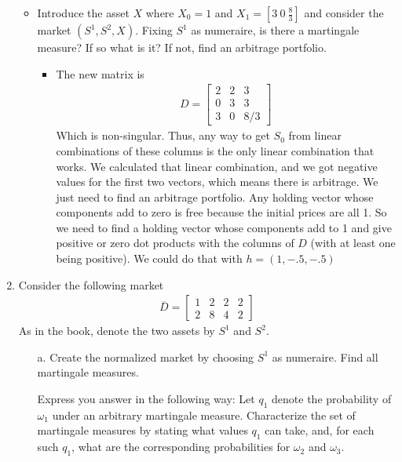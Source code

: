 \documentclass[12pt]{article}
\renewcommand{\o}{\omega}
\newcommand{\ol}{\overline}
\begin{document}
\begin{enumerate}
\begin{itemize}
        \item Introduce the asset $X$ where $X_0 = 1$ and $X_1 = [3\ 0\ \frac{8}{3}]$ and consider the market $(S^1, S^2, X)$. Fixing $S^1$ as numeraire, is there a martingale measure? If so what is it? If not, find an arbitrage portfolio.
        \begin{itemize}
            \item The new matrix is
                        \begin{align*}
    D=
    \left[\begin{array}{lll}
    2 & 2 & 3\\
     0 & 3 & 3 \\
     3 & 0 & 8/3
    \end{array}
    \right]
    \end{align*}
    Which is non-singular. Thus, any way to get $S_0$ from linear combinations of these columns is the only linear combination that works. We calculated that linear combination, and we got negative values for the first two vectors, which means there is arbitrage. We just need to find an arbitrage portfolio. Any holding vector whose components add to zero is free because the initial prices are all 1. So we need to find a holding vector whose components add to 1 and give positive or zero dot products with the columns of $D$ (with at least one being positive). We could do that with $h = (1,-.5,-.5)$ 
        \end{itemize}
        
      \end{itemize}
      \item Consider the following market
\begin{align*}
\ol{D} = \begin{bmatrix}
1	& 2	& 2	& 2\\
2	& 8	& 4	& 2
\end{bmatrix}
\end{align*}
As in the book, denote the two assets by $S^1$ and $S^2$.

\begin{itemize}
  \item[a.] Create the normalized market by choosing $S^1$ as numeraire. Find all martingale measures. 
  
  Express you answer in the following way: Let $q_1$ denote the probability of $\o_1$ under an arbitrary martingale measure. Characterize the set of martingale measures by stating what values $q_1$ can take, and, for each such $q_1$, what are the corresponding probabilities for $\o_2$ and $\o_3$.
  

\end{itemize}
\end{enumerate}
\end{document}
